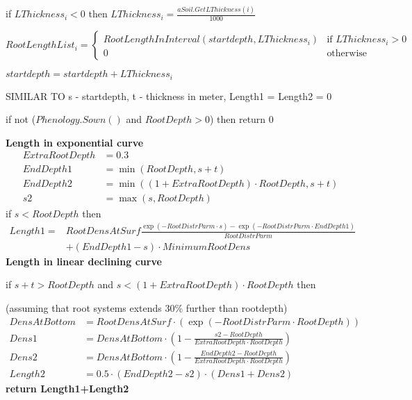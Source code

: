 \documentclass[%
]{scrartcl}
\newcommand\mymarginpar[1]{\marginpar {\flushleft\bfseries\scriptsize #1}}
\begin{document}
  \quad    if $LThickness_i<0$ then
      $ LThickness_i= \tfrac{aSoil.GetLThickness(i)}{1000} $
      
\quad$ RootLengthList_i= 
   \begin{cases}
 RootLengthInInterval(startdepth,LThickness_i) & \text{if $LThickness_i>0$} \\
       0 & \text{otherwise}
     \end{cases}
     $     
          
\quad    $startdepth = startdepth+ LThickness_i$	

SIMILAR TO \citep{berntsen2005simulation}
s - startdepth, t - thickness in meter,  Length1  =  Length2  = 0

    if not ($Phenology.Sown()$ and $RootDepth > 0$) then return $0$

    \textbf{Length in exponential curve}
    \begin{align*} 
     ExtraRootDepth & = 0.3 \\
     EndDepth1 & = \min(RootDepth,s+t)  \\
     EndDepth2 & = \min((1+ExtraRootDepth)  \cdot  RootDepth,s+t) \\
     s2 & = \max(s,RootDepth)      
    \end{align*}
	if $s<RootDepth $ then  \mymarginpar{MinimumRootDens}		
		\begin{align*}
			Length1 = & RootDensAtSurf \tfrac{\exp(-RootDistrParm  \cdot  s) 
			          -   \exp(-RootDistrParm  \cdot  EndDepth1)}{RootDistrParm} \\
			          &   +  (EndDepth1-s)  \cdot  MinimumRootDens 
	  \end{align*}
%
    \textbf{Length in linear declining curve}
       
   	if $s + t > RootDepth$ and $s < (1+ExtraRootDepth)  \cdot  RootDepth$ then
				
		\quad  (assuming that root systems extends 30\% further than rootdepth)
       \begin{align*}
  DensAtBottom & = RootDensAtSurf  \cdot  (\exp(-RootDistrParm  \cdot  RootDepth))\\
  Dens1 & = DensAtBottom  \cdot  \left(1-\tfrac{s2-RootDepth}
  {ExtraRootDepth  \cdot  RootDepth}\right) \\  
 Dens2 & = DensAtBottom  \cdot  \left(1-\tfrac{EndDepth2-RootDepth}
 {ExtraRootDepth  \cdot  RootDepth}\right)  \\  	  
         Length2 & = 0.5  \cdot  (EndDepth2-s2)  \cdot  (Dens1+Dens2)
         \end{align*}  
  \textbf{return Length1+Length2}
  
\end{document}
